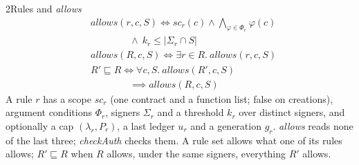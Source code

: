 \begin{perchdefinition}{2}{Rules and \emph{allows}}\label{def:rules-and-allows}
\[\begin{aligned}&\mathit{allows}(r, c, S) \iff \mathit{sc}_r(c) \land \bigwedge_{\varphi \in \Phi_r} \varphi(c)\\
&\qquad\qquad \land\ k_r \le |\Sigma_r \cap S|\\
&\mathit{allows}(R, c, S) \iff \exists r \in R.\ \mathit{allows}(r, c, S)\\
&R' \sqsubseteq R \iff \forall c, S.\ \mathit{allows}(R', c, S)\\
&\qquad\qquad \implies \mathit{allows}(R, c, S)\end{aligned}\]
A rule \(r\) has a scope \(\mathit{sc}_r\) (one contract and a function list; false on creations), argument conditions \(\Phi_r\), signers \(\Sigma_r\) and a threshold \(k_r\) over distinct signers, and optionally a cap \((\lambda_r, P_r)\), a last ledger \(u_r\) and a generation \(g_r\). \emph{allows} reads none of the last three; \emph{checkAuth} checks them. A rule set allows what one of its rules allows; \(R' \sqsubseteq R\) when \(R\) allows, under the same signers, everything \(R'\) allows.
\end{perchdefinition}
